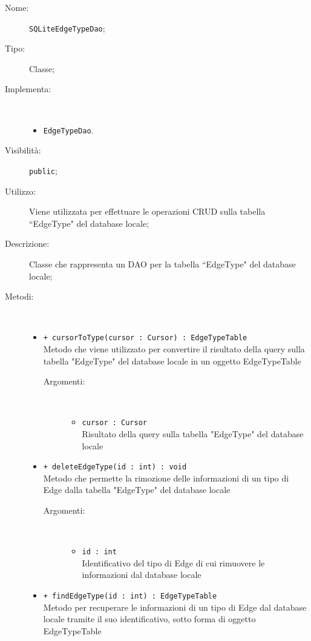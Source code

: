 \documentclass[../DefinizioneDiProdotto.tex]{subfiles}
\begin{document}
    \begin{description}
\item[Nome:] \texttt{SQLiteEdgeTypeDao};
\item[Tipo:] Classe;
\item[Implementa:] \
\begin{itemize}
\item \texttt{EdgeTypeDao}.

\end{itemize}
\item[Visibilità:] \texttt{public};
\item[Utilizzo:] Viene utilizzata per effettuare le operazioni CRUD sulla tabella “EdgeType" del database locale;
\item[Descrizione:] Classe che rappresenta un DAO per la tabella “EdgeType" del database locale;
\item[Metodi:] \
\begin{itemize}
\item \texttt{+ cursorToType(cursor : Cursor) : EdgeTypeTable}\\
Metodo che viene utilizzato per convertire il risultato della query sulla tabella "EdgeType" del database locale in un oggetto EdgeTypeTable
 \begin{description}
\item[Argomenti:] \
\begin{itemize}
\item \texttt{cursor : Cursor}\\
Risultato della query sulla tabella "EdgeType" del database locale\end{itemize}
\end{description}
\item \texttt{+ deleteEdgeType(id : int) : void}\\
Metodo che permette la rimozione delle informazioni di un tipo di Edge dalla tabella "EdgeType" del database locale
 \begin{description}
\item[Argomenti:] \
\begin{itemize}
\item \texttt{id : int}\\
Identificativo del tipo di Edge di cui rimuovere le informazioni dal database locale\end{itemize}
\end{description}
\item \texttt{+ findEdgeType(id : int) : EdgeTypeTable}\\
Metodo per recuperare le informazioni di un tipo di Edge dal database locale tramite il suo identificativo, sotto forma di oggetto EdgeTypeTable

\end{itemize}
\end{description}
\end{document}
